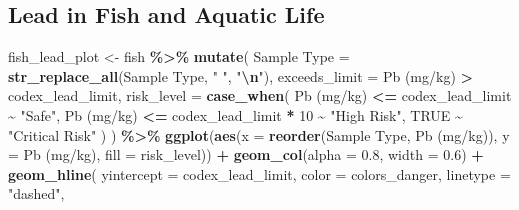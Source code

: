 \documentclass[
]{article}
\newenvironment{Shaded}{\begin{snugshade}}{\end{snugshade}}
\newcommand{\AttributeTok}[1]{\textcolor[rgb]{0.13,0.29,0.53}{#1}}
\newcommand{\ConstantTok}[1]{\textcolor[rgb]{0.56,0.35,0.01}{#1}}
\newcommand{\DecValTok}[1]{\textcolor[rgb]{0.00,0.00,0.81}{#1}}
\newcommand{\FloatTok}[1]{\textcolor[rgb]{0.00,0.00,0.81}{#1}}
\newcommand{\FunctionTok}[1]{\textcolor[rgb]{0.13,0.29,0.53}{\textbf{#1}}}
\newcommand{\NormalTok}[1]{#1}
\newcommand{\OtherTok}[1]{\textcolor[rgb]{0.56,0.35,0.01}{#1}}
\newcommand{\SpecialCharTok}[1]{\textcolor[rgb]{0.81,0.36,0.00}{\textbf{#1}}}
\newcommand{\StringTok}[1]{\textcolor[rgb]{0.31,0.60,0.02}{#1}}
\begin{document}
\subsection{Lead in Fish and Aquatic
Life}\label{lead-in-fish-and-aquatic-life}

\begin{Shaded}
\begin{Highlighting}[]
\NormalTok{fish\_lead\_plot }\OtherTok{\textless{}{-}}\NormalTok{ fish }\SpecialCharTok{\%\textgreater{}\%}
  \FunctionTok{mutate}\NormalTok{(}
    \StringTok{\textasciigrave{}}\AttributeTok{Sample Type}\StringTok{\textasciigrave{}} \OtherTok{=} \FunctionTok{str\_replace\_all}\NormalTok{(}\StringTok{\textasciigrave{}}\AttributeTok{Sample Type}\StringTok{\textasciigrave{}}\NormalTok{, }\StringTok{" "}\NormalTok{, }\StringTok{"}\SpecialCharTok{\textbackslash{}n}\StringTok{"}\NormalTok{),}
    \AttributeTok{exceeds\_limit =} \StringTok{\textasciigrave{}}\AttributeTok{Pb (mg/kg)}\StringTok{\textasciigrave{}} \SpecialCharTok{\textgreater{}}\NormalTok{ codex\_lead\_limit,}
    \AttributeTok{risk\_level =} \FunctionTok{case\_when}\NormalTok{(}
      \StringTok{\textasciigrave{}}\AttributeTok{Pb (mg/kg)}\StringTok{\textasciigrave{}} \SpecialCharTok{\textless{}=}\NormalTok{ codex\_lead\_limit }\SpecialCharTok{\textasciitilde{}} \StringTok{"Safe"}\NormalTok{,}
      \StringTok{\textasciigrave{}}\AttributeTok{Pb (mg/kg)}\StringTok{\textasciigrave{}} \SpecialCharTok{\textless{}=}\NormalTok{ codex\_lead\_limit }\SpecialCharTok{*} \DecValTok{10} \SpecialCharTok{\textasciitilde{}} \StringTok{"High Risk"}\NormalTok{,}
      \ConstantTok{TRUE} \SpecialCharTok{\textasciitilde{}} \StringTok{"Critical Risk"}
\NormalTok{    )}
\NormalTok{  ) }\SpecialCharTok{\%\textgreater{}\%}
  \FunctionTok{ggplot}\NormalTok{(}\FunctionTok{aes}\NormalTok{(}\AttributeTok{x =} \FunctionTok{reorder}\NormalTok{(}\StringTok{\textasciigrave{}}\AttributeTok{Sample Type}\StringTok{\textasciigrave{}}\NormalTok{, }\StringTok{\textasciigrave{}}\AttributeTok{Pb (mg/kg)}\StringTok{\textasciigrave{}}\NormalTok{), }\AttributeTok{y =} \StringTok{\textasciigrave{}}\AttributeTok{Pb (mg/kg)}\StringTok{\textasciigrave{}}\NormalTok{, }\AttributeTok{fill =}\NormalTok{ risk\_level)) }\SpecialCharTok{+}
  \FunctionTok{geom\_col}\NormalTok{(}\AttributeTok{alpha =} \FloatTok{0.8}\NormalTok{, }\AttributeTok{width =} \FloatTok{0.6}\NormalTok{) }\SpecialCharTok{+}
  \FunctionTok{geom\_hline}\NormalTok{(}
    \AttributeTok{yintercept =}\NormalTok{ codex\_lead\_limit, }
    \AttributeTok{color =}\NormalTok{ colors\_danger, }
    \AttributeTok{linetype =} \StringTok{"dashed"}\NormalTok{, }

\end{Highlighting}
\end{Shaded}
\end{document}
